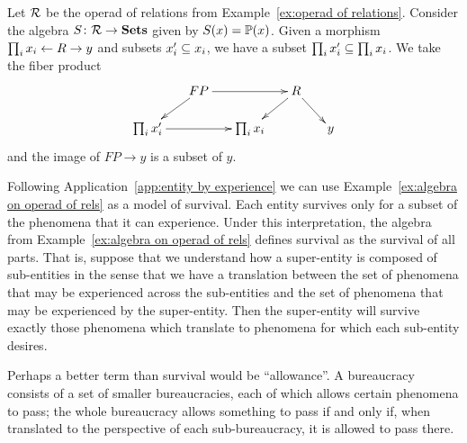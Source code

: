 \documentclass[CT4S-EN-RU]{subfiles}
\begin{document}
\begin{applicationRUS}\label{app:entity by experience}
\end{applicationRUS}

\begin{exampleENG}\label{ex:algebra on operad of rels}
Let $\mcR$ be the operad of relations from Example~\ref{ex:operad of relations}. Consider the algebra $S\taking\mcR\to\Sets$ given by $S(x)=\PP(x)$. Given a morphism $\prod_ix_i\from R\to y$ and subsets $x_i'\ss x_i$, we have a subset $\prod_ix_i'\ss\prod_ix_i$. We take the fiber product
$$\xymatrix@=15pt{&FP\ar[rr]\ar[ld]&&R\ar[ld]\ar[rd]\\\prod_ix_i'\ar[rr]&&\prod_ix_i&&y}$$
and the image of $FP\to y$ is a subset of $y$. 
\end{exampleENG}

\begin{exampleRUS}\label{ex:algebra on operad of rels}
\end{exampleRUS}

\begin{applicationENG}\label{app:desire}
Following Application~\ref{app:entity by experience} we can use Example~\ref{ex:algebra on operad of rels} as a model of survival. Each entity survives only for a subset of the phenomena that it can experience. Under this interpretation, the algebra from Example~\ref{ex:algebra on operad of rels} defines survival as the survival of all parts. That is, suppose that we understand how a super-entity is composed of sub-entities in the sense that we have a translation between the set of phenomena that may be experienced across the sub-entities and the set of phenomena that may be experienced by the super-entity. Then the super-entity will survive exactly those phenomena which translate to phenomena for which each sub-entity desires. 

Perhaps a better term than survival would be “allowance”. A bureaucracy consists of a set of smaller bureaucracies, each of which allows certain phenomena to pass; the whole bureaucracy allows something to pass if and only if, when translated to the perspective of each sub-bureaucracy, it is allowed to pass there.
\end{applicationENG}

\begin{applicationRUS}\label{app:desire}
\end{applicationRUS}
\end{document}
